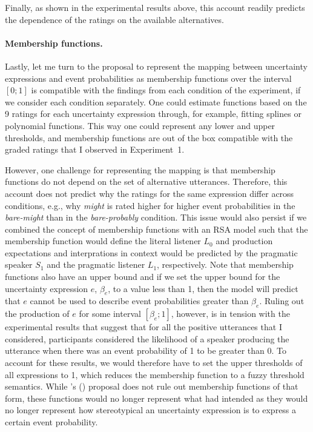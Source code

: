 Finally, as shown in the experimental results above, this account readily predicts the dependence of the ratings on the available alternatives.

\paragraph{Membership functions.} Lastly, let me turn to the proposal to represent the mapping between uncertainty expressions and event probabilities
as membership functions over the interval $[0;1]$ is compatible with the findings from each condition of the experiment, 
if we consider each condition separately.  One could estimate functions  based on the 9 ratings for each uncertainty expression through, 
for example, fitting splines or polynomial functions. This way one could represent any lower and upper thresholds, and membership functions 
are out of the box compatible with the graded ratings that I observed in Experiment~1.

However, one challenge for representing the mapping is that membership functions do not depend on the set of alternative utterances. Therefore,
this account does not predict why the ratings for the same expression differ across conditions, e.g., why \textit{might} is rated higher for higher event probabilities in
the \textit{bare-might} than in the \textit{bare-probably} condition. This issue would also persist if we combined the concept of membership functions with an RSA model such that the
membership function would define the literal listener $L_0$ and production expectations and interprations in context would be predicted by the 
pragmatic speaker $S_1$ and the pragmatic listener $L_1$, respectively. Note that membership functions also have an upper bound and if we set the upper bound for 
the uncertainty expression $e$, $\beta_e$, to a value less than 1, then the model will predict that $e$ cannot be used to describe event probabilities greater than $\beta_e$.
Ruling out the production of $e$ for some interval $[\beta_e; 1]$, however, is in tension with the experimental results that suggest that for all the positive utterances that I considered, 
participants considered the likelihood of a speaker producing the utterance when there was an event probability of 1 to be greater than 0. To account for these results, we would therefore 
have to set the upper thresholds of all expressions to 1, which reduces the membership function to a fuzzy threshold semantics. While \citeauthor{Wallsten1986}'s (\citeyear{Wallsten1986})
proposal does not rule out membership functions of that form, these functions would no longer represent what \textcite{Wallsten1986} had intended as they would
no longer represent how stereotypical an uncertainty expression is to express a certain event probability.

